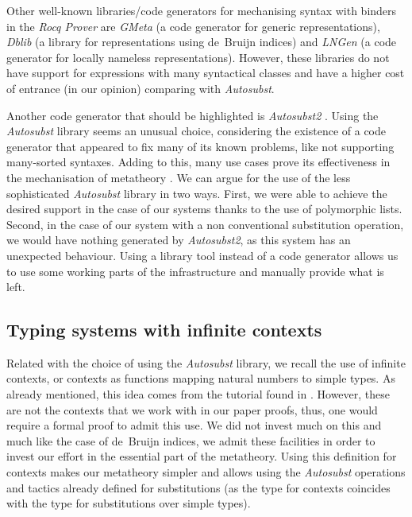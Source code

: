Other well-known libraries/code generators for mechanising syntax with binders in the \textit{Rocq Prover} are \textit{GMeta} \cite{GMeta} (a code generator for generic representations), \textit{Dblib} \cite{Dblib} (a library for representations using de~Bruijn indices) and \textit{LNGen} \cite{LNGen} (a code generator for locally nameless representations).
However, these libraries do not have support for expressions with many syntactical classes and have a higher cost of entrance (in our opinion) comparing with \textit{Autosubst}.

Another code generator that should be highlighted is \textit{Autosubst2} \cite{Autosubst2}.
Using the \textit{Autosubst} library seems an unusual choice, considering the existence of a code generator that appeared to fix many of its known problems, like not supporting many-sorted syntaxes.
Adding to this, many use cases prove its effectiveness in the mechanisation of metatheory \cite{Forster2019,Dudenhefner2024,POPLmarkReloaded}.
We can argue for the use of the less sophisticated \textit{Autosubst} library in two ways.
First, we were able to achieve the desired support in the case of our systems thanks to the use of polymorphic lists.
Second, in the case of our system with a non conventional substitution operation, we would have nothing generated by \textit{Autosubst2}, as this system has an unexpected behaviour.
Using a library tool instead of a code generator allows us to use some working parts of the infrastructure and manually provide what is left.

\subsection{Typing systems with infinite contexts}
Related with the choice of using the \textit{Autosubst} library, we recall the use of infinite contexts, or contexts as functions mapping natural numbers to simple types.
As already mentioned, this idea comes from the tutorial found in \cite{AutosubstManual}.
However, these are not the contexts that we work with in our paper proofs, thus, one would require a formal proof to admit this use.
We did not invest much on this and much like the case of de~Bruijn indices, we admit these facilities in order to invest our effort in the essential part of the metatheory.
Using this definition for contexts makes our metatheory simpler and allows using the \textit{Autosubst} operations and tactics already defined for substitutions (as the type for contexts coincides with the type for substitutions over simple types).

